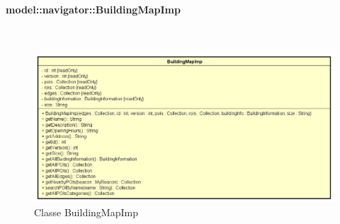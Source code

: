 \documentclass[../DefinizioneDiProdotto.tex]{subfiles}
\begin{document}
\paragraph{model::navigator::BuildingMapImp}
\
\begin{figure}[H]
	\centering
	\includegraphics[width=\maxwidth]{img/BuildingMapImp.png}
	\caption{Classe BuildingMapImp}\label{fig:model::navigator::BuildingMapImp} 
\end{figure}
\end{document}
